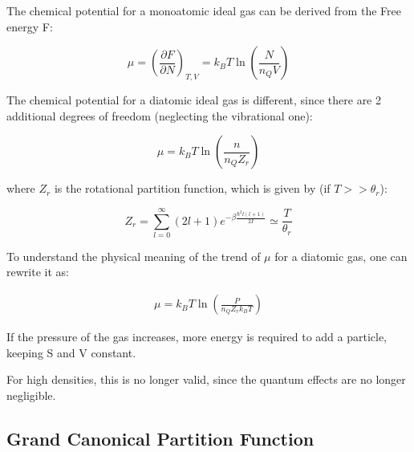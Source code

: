 \documentclass{article}
\begin{document}
The chemical potential for a monoatomic ideal gas can be derived from the Free energy F:

\begin{tcolorbox}[colframe=gray!50, colback=gray!10, coltitle=black, title=Chemical Potential for an Ideal Gas]

    \begin{equation}
        \mu=\left( \frac{\partial F}{\partial N} \right)_{T,V}=k_BT\ln{\left( \frac{N}{n_QV} \right)}
    \end{equation}

\end{tcolorbox}

The chemical potential for a diatomic ideal gas is different, since there are 2 additional degrees of freedom (neglecting the vibrational one):

\begin{tcolorbox}[colframe=gray!50, colback=gray!10, coltitle=black, title=Chemical Potential for a
        Diatomic Ideal Gas]

    \begin{equation}
        \mu=k_BT\ln{\left( \frac{n}{n_QZ_r} \right)}
    \end{equation}

    where $Z_r$ is the rotational partition function, which is given by (if $T>>\theta_r$):

    \begin{equation}
        Z_r=\sum_{l=0}^{\infty}(2l+1)e^{-\beta\frac{\hbar^2 l(l+1)}{2I}}\simeq \frac{T}{\theta_r}
    \end{equation}
\end{tcolorbox}

To understand the physical meaning of the trend of $\mu$ for a diatomic gas, one can rewrite it as:

\begin{align*}
    \mu=k_BT\ln{\left( \frac{P}{n_QZ_rk_BT} \right)}
\end{align*}

If the pressure of the gas increases, more energy is required to add a particle, keeping S and V constant.

For high densities, this is no longer valid, since the quantum effects are no longer negligible.

\subsection{Grand Canonical Partition Function}
\end{document}
